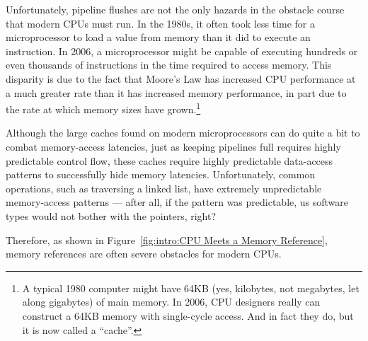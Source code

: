 Unfortunately, pipeline flushes are not the only hazards in the obstacle
course that modern CPUs must run.
In the 1980s, it often took less time for a microprocessor to load a value
from memory than it did to execute an instruction.
In 2006, a microprocessor might be capable of executing hundreds or even
thousands of instructions in the time required to access memory.
This disparity is due to the fact that Moore's Law has increased CPU
performance at a much greater rate than it has increased memory
performance, in part due to the rate at which memory sizes have
grown.\footnote{
	A typical 1980 computer might have 64KB (yes, kilobytes,
	not megabytes, let along gigabytes) of main memory.
	In 2006, CPU designers really can construct a 64KB memory
	with single-cycle access.
	And in fact they do, but it is now called a ``cache''.}

Although the large caches found on modern microprocessors can do quite
a bit to combat memory-access latencies,
just as keeping pipelines full requires highly predictable control flow,
these caches require highly predictable data-access patterns to
successfully hide memory latencies.
Unfortunately, common operations, such as traversing a linked list,
have extremely unpredictable memory-access patterns --- after all,
if the pattern was predictable, us software types would not bother
with the pointers, right?

Therefore, as shown in
Figure~\ref{fig:intro:CPU Meets a Memory Reference},
memory references are often severe obstacles for modern CPUs.

